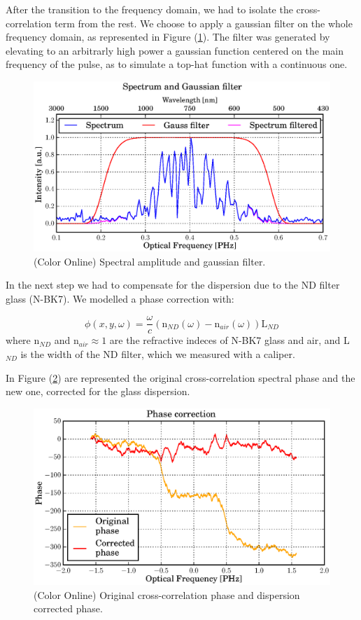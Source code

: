 \documentclass[12pt,a4paper,twoside]{article}
\begin{document}
After the transition to the frequency domain, we had to isolate the cross-correlation term from the rest.
We choose to apply a gaussian filter on the whole frequency domain, as represented in Figure (\ref{fig_filter}).
The filter was generated by elevating to an arbitrarly high power a gaussian function centered on the main frequency of the pulse, as to simulate a top-hat function with a continuous one.

\begin{figure}
	\centering
	\includegraphics[scale=0.9]{data/filter}
	\caption{(Color Online) Spectral amplitude and gaussian filter.}
	\label{fig_filter}
\end{figure}

In the next step we had to compensate for the dispersion due to the ND filter glass (N-BK7).
We modelled a phase correction with:

\begin{equation}
	\phi(x,y,\omega) = \frac{\omega}{c}\left( \mathrm{n}_{ND}(\omega) - \mathrm{n}_{air}(\omega)\right)\mathrm{L}_{ND}
\end{equation}
where $\mathrm{n}_{ND}$ and $\mathrm{n}_{air} \approx 1$ are the refractive indeces of N-BK7 glass and air, and L$_{ND}$ is the width of the ND filter, which we measured with a caliper.

In Figure (\ref{fig_phase_correction}) are represented the original cross-correlation spectral phase and the new one, corrected for the glass dispersion.
\begin{figure}
	\centering
	\includegraphics[scale=0.9]{data/phase_correction}
	\caption{(Color Online) Original cross-correlation phase and dispersion corrected phase.}
	\label{fig_phase_correction}
\end{figure}
\end{document}
